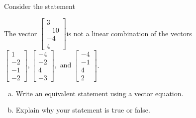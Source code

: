 
\begin{exerciseStatement}


Consider the statement 
\begin{center}\begin{minipage}{0.8\textwidth}
 The vector \( \left[\begin{array}{c}
3 \\
-10 \\
-4 \\
4
\end{array}\right] \)is not a linear combination of the vectors \( \left[\begin{array}{c}
1 \\
-2 \\
-1 \\
-2
\end{array}\right] , \left[\begin{array}{c}
-4 \\
-2 \\
4 \\
-3
\end{array}\right] , \text{ and } \left[\begin{array}{c}
-4 \\
-1 \\
4 \\
2
\end{array}\right] \). 
\end{minipage}\end{center}
    


\begin{enumerate}[(a)]
\item  Write an equivalent statement using a vector equation.
\item  Explain why your statement is true or false.
\end{enumerate}
    
\end{exerciseStatement}
    
